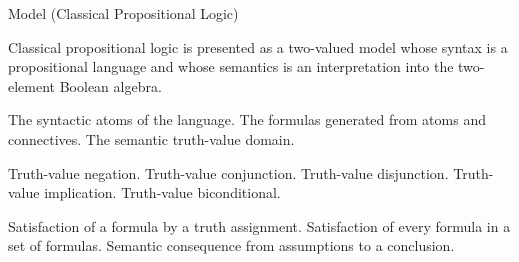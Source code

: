 \begin{modelbox}{Model (Classical Propositional Logic)}
\begin{model}\label{model:classical-propositional-logic}

Classical propositional logic is presented as a two-valued model whose syntax
is a propositional language and whose semantics is an interpretation into the
two-element Boolean algebra.

\begin{modelsorts}
    {The syntactic atoms of the language.}
    {The formulas generated from atoms and connectives.}
    {The semantic truth-value domain.}
\end{modelsorts}

\begin{modelconstants}
\end{modelconstants}

\begin{modelarity}
\end{modelarity}

\begin{modelfunctions}
    {Truth-value negation.}
    {Truth-value conjunction.}
    {Truth-value disjunction.}
    {Truth-value implication.}
    {Truth-value biconditional.}
\end{modelfunctions}

\begin{modelrelations}
    {Satisfaction of a formula by a truth assignment.}
    {Satisfaction of every formula in a set of formulas.}
  \modelrelation{\models}{\Gamma\models\varphi}
    {Semantic consequence from assumptions to a conclusion.}
\end{modelrelations}


\end{model}
\end{modelbox}
